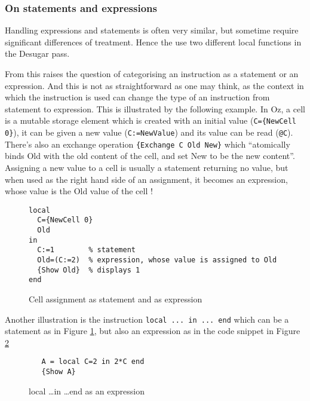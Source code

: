 \documentclass[a4paper]{memoir}
\begin{document}
\subsubsection{On statements and expressions}
Handling expressions and statements is often very similar, but sometime require significant differences of treatment. Hence the use two different local functions in the Desugar pass.

From this raises the question of categorising an instruction as a statement or an expression. And this is not as straightforward as one may think, as the context in which the instruction is used can change the type of an instruction from statement to expression. This is illustrated by the following example.
In Oz, a cell is a mutable storage element which is created with an initial value (\lstinline!C={NewCell 0}!), it can be given a new value (\lstinline!C:=NewValue!) and its value can be read (\lstinline!@C!). There's also an exchange operation \lstinline!{Exchange C Old New}! which ``atomically binds Old with the old content of the cell, and set New to be the new content''.%
Assigning a new value to a cell is usually a statement returning no value, but when used as the right hand side of an assignment, it becomes an expression, whose value is the Old value of the cell !
\begin{figure}[h]
\begin{lstlisting}
local
  C={NewCell 0}
  Old
in
  C:=1        % statement
  Old=(C:=2)  % expression, whose value is assigned to Old
  {Show Old}  % displays 1
end

\end{lstlisting}
\caption{Cell assignment as statement and as expression}
\label{fig:statement_and_expression1}
\end{figure}
Another illustration is the instruction \lstinline!local ... in ... end! which can be a statement as in Figure \ref{fig:statement_and_expression1}, but also an expression as in the code snippet in Figure \ref{fig:statement_and_expression2}

\begin{figure}[h]
\begin{lstlisting}
   A = local C=2 in 2*C end
   {Show A}
\end{lstlisting}
\caption{local \ldots in \ldots end as an expression}
\label{fig:statement_and_expression2}
\end{figure}
\end{document}
